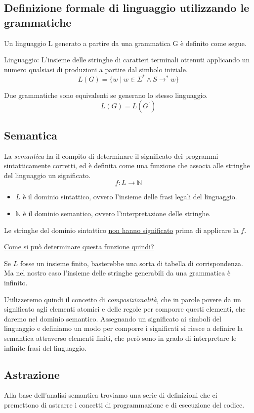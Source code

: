 \documentclass{article}
\begin{document}
\subsection*{Definizione formale di linguaggio utilizzando le grammatiche}
Un linguaggio L generato a partire da una grammatica G è definito come segue.
\begin{dfn}{Linguaggio:}
  L'insieme delle stringhe di caratteri terminali ottenuti applicando un numero qualsiasi di produzioni a partire dal simbolo iniziale.
  \[L(G) = \{ w \mid w \in \Sigma^* \land S \rightarrow^* w\}\]
\end{dfn}
\noindent Due grammatiche sono equivalenti se generano lo stesso linguaggio.
\[L(G) = L(G^\prime)\]
\pagebreak

\subsection{Semantica}
La \emph{semantica} ha il compito di determinare il significato dei programmi sintatticamente corretti, ed è definita come una funzione che associa alle stringhe del linguaggio un significato.
\[f: L \rightarrow \mathbb{N}\]
\begin{itemize}
  \item \(L\) è il dominio sintattico, ovvero l'insieme delle frasi legali del linguaggio.
  \item \(\mathbb{N}\) è il dominio semantico, ovvero l'interpretazione delle stringhe.
\end{itemize}
Le stringhe del dominio sintattico \underline{non hanno significato} prima di applicare la \(f\).

\vspace{.5cm}

\noindent\underline{Come si può determinare questa funzione quindi?}

Se \(L\) fosse un insieme finito, basterebbe una sorta di tabella di corrispondenza. Ma nel nostro caso l'insieme delle stringhe generabili da una grammatica è infinito.

Utilizzeremo quindi il concetto di \emph{composizionalità}, che in parole povere da un significato agli elementi atomici e delle regole per comporre questi elementi, che daremo nel dominio semantico. Assegnando un significato ai simboli del linguaggio e definiamo un modo per comporre i significati si riesce a definire la semantica attraverso elementi finiti, che però sono in grado di interpretare le infinite frasi del linguaggio.
\subsection*{Astrazione}
Alla base dell'analisi semantica troviamo una serie di definizioni che ci premettono di astrarre i concetti di programmazione e di esecuzione del codice.
\end{document}
